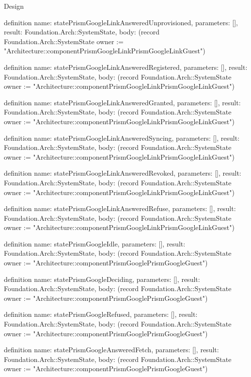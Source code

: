 \begin{lexlean}{Design}
\begin{semanticmodule}
definition{
  name: statePrismGoogleLinkAnsweredUnprovisioned,
  parameters: [],
  result: Foundation.Arch::SystemState,
  body: (record Foundation.Arch::SystemState {owner := "Architecture::componentPrismGoogleLinkPrismGoogleLinkGuest"})
}

definition{
  name: statePrismGoogleLinkAnsweredRegistered,
  parameters: [],
  result: Foundation.Arch::SystemState,
  body: (record Foundation.Arch::SystemState {owner := "Architecture::componentPrismGoogleLinkPrismGoogleLinkGuest"})
}

definition{
  name: statePrismGoogleLinkAnsweredGranted,
  parameters: [],
  result: Foundation.Arch::SystemState,
  body: (record Foundation.Arch::SystemState {owner := "Architecture::componentPrismGoogleLinkPrismGoogleLinkGuest"})
}

definition{
  name: statePrismGoogleLinkAnsweredSyncing,
  parameters: [],
  result: Foundation.Arch::SystemState,
  body: (record Foundation.Arch::SystemState {owner := "Architecture::componentPrismGoogleLinkPrismGoogleLinkGuest"})
}

definition{
  name: statePrismGoogleLinkAnsweredRevoked,
  parameters: [],
  result: Foundation.Arch::SystemState,
  body: (record Foundation.Arch::SystemState {owner := "Architecture::componentPrismGoogleLinkPrismGoogleLinkGuest"})
}

definition{
  name: statePrismGoogleLinkAnsweredRefuse,
  parameters: [],
  result: Foundation.Arch::SystemState,
  body: (record Foundation.Arch::SystemState {owner := "Architecture::componentPrismGoogleLinkPrismGoogleLinkGuest"})
}

definition{
  name: statePrismGoogleIdle,
  parameters: [],
  result: Foundation.Arch::SystemState,
  body: (record Foundation.Arch::SystemState {owner := "Architecture::componentPrismGooglePrismGoogleGuest"})
}

definition{
  name: statePrismGoogleDeciding,
  parameters: [],
  result: Foundation.Arch::SystemState,
  body: (record Foundation.Arch::SystemState {owner := "Architecture::componentPrismGooglePrismGoogleGuest"})
}

definition{
  name: statePrismGoogleRefused,
  parameters: [],
  result: Foundation.Arch::SystemState,
  body: (record Foundation.Arch::SystemState {owner := "Architecture::componentPrismGooglePrismGoogleGuest"})
}

definition{
  name: statePrismGoogleAnsweredFetch,
  parameters: [],
  result: Foundation.Arch::SystemState,
  body: (record Foundation.Arch::SystemState {owner := "Architecture::componentPrismGooglePrismGoogleGuest"})
}


\end{semanticmodule}
\end{lexlean}
